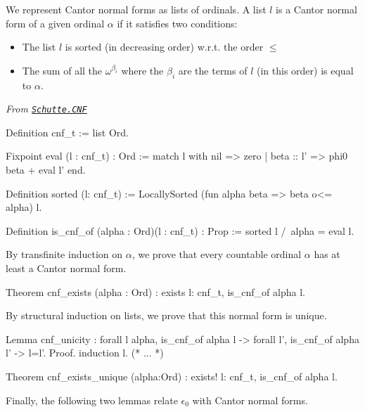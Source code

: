 {We represent  Cantor normal forms as lists of ordinals.
A  list $l$ is a Cantor normal form of a given ordinal $\alpha$ if it satisfies two conditions:



\begin{itemize}
\item The list  $l$ is sorted (in decreasing order) w.r.t. the order $\leq$
\item The sum of all the  $\omega^{\beta_i}$ where the $\beta_i$ are the terms of $l$ (in this order) is equal to $\alpha$.
\end{itemize}



\vspace{4pt}

\noindent\emph{From \href{../src/html/hydras.Schutte.CNF.html\#cnf_t}%
{\texttt{Schutte.CNF}}}


\begin{Coqsrc}
 Definition cnf_t := list Ord.

Fixpoint eval (l : cnf_t) : Ord :=
  match l with nil => zero
              | beta :: l' => phi0 beta + eval l'
  end.

Definition sorted (l: cnf_t) :=
  LocallySorted (fun alpha beta => beta o<= alpha) l.

Definition is_cnf_of (alpha : Ord)(l : cnf_t) : Prop :=
  sorted l /\ alpha = eval l.
\end{Coqsrc}


By transfinite induction on $\alpha$, we prove that every countable ordinal $\alpha$ 
 has at least a Cantor normal form.

\begin{Coqsrc}
Theorem cnf_exists (alpha : Ord) :
  exists l: cnf_t, is_cnf_of alpha l.
\end{Coqsrc}

By structural induction on lists, we prove that this normal form is unique.

\begin{Coqsrc}
 Lemma cnf_unicity : forall l alpha, 
   is_cnf_of alpha l -> 
   forall l',  is_cnf_of alpha l' -> l=l'.
Proof.
 induction l.
 (*  ...  *)

Theorem cnf_exists_unique (alpha:Ord) :
  exists! l: cnf_t, is_cnf_of alpha l.
\end{Coqsrc}


Finally, the following two lemmas relate  $\epsilon_0$ with Cantor normal forms.

}
